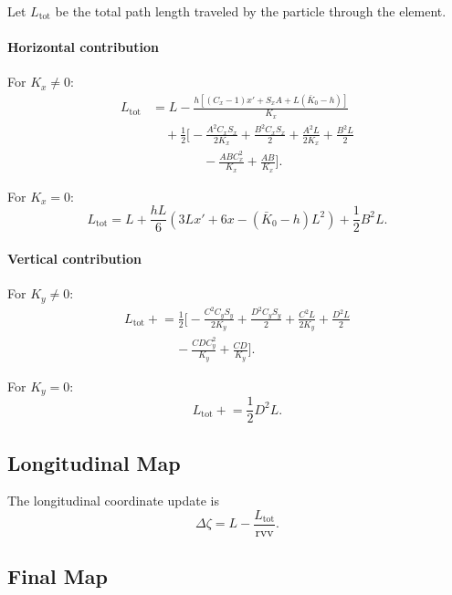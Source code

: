 Let $L_{\text{tot}}$ be the total path length traveled by the particle through the element.

\paragraph{Horizontal contribution}

For $K_x\neq 0$:
\begin{align}
L_{\text{tot}} &= L
- \frac{h\left[(C_x-1)x' + S_x A + L(\bar{K}_0-h)\right]}{K_x} \nonumber\\
&\quad + \frac{1}{2}\Bigg[
- \frac{A^2 C_x S_x}{2K_x}
+ \frac{B^2 C_x S_x}{2}
+ \frac{A^2 L}{2K_x}
+ \frac{B^2 L}{2} \nonumber\\
&\qquad\qquad
- \frac{A B C_x^2}{K_x}
+ \frac{A B}{K_x}
\Bigg].
\end{align}

For $K_x=0$:
\begin{equation}
L_{\text{tot}} =
L
+ \frac{hL}{6}\left(3Lx' + 6x - (\bar{K}_0-h)L^2\right)
+ \frac{1}{2}B^2 L .
\end{equation}

\paragraph{Vertical contribution}

For $K_y\neq 0$:
\begin{align}
L_{\text{tot}} \mathrel{+}= \frac{1}{2}\Bigg[
- \frac{C^2 C_y S_y}{2K_y}
+ \frac{D^2 C_y S_y}{2}
+ \frac{C^2 L}{2K_y}
+ \frac{D^2 L}{2} \nonumber\\
\qquad\qquad
- \frac{C D C_y^2}{K_y}
+ \frac{C D}{K_y}
\Bigg].
\end{align}

For $K_y=0$:
\begin{equation}
L_{\text{tot}} \mathrel{+}= \frac{1}{2}D^2 L .
\end{equation}

\subsection*{Longitudinal Map}

The longitudinal coordinate update is
\begin{equation}
\Delta\zeta = L - \frac{L_{\text{tot}}}{\mathrm{rvv}} .
\end{equation}

\subsection*{Final Map}

